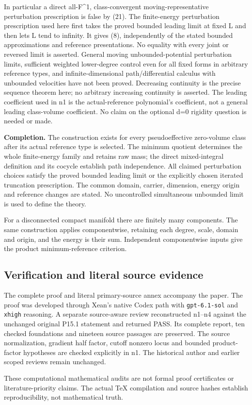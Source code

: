 \documentclass[
]{article}
\begin{document}
In particular a direct all-F\^{}1, class-convergent
moving-representative perturbation prescription is false by (21).
The finite-energy perturbation prescription used here first takes the
proved bounded leading limit at fixed L and then lets L tend to
infinity. It gives (8), independently of the stated bounded
approximations and reference presentations. No equality with every
joint or reversed limit is asserted. General moving unbounded-potential perturbation limits,
sufficient weighted lower-degree control even for all fixed forms in
arbitrary reference types, and infinite-dimensional path/differential
calculus with unbounded velocities have not been proved. Decreasing
continuity is the precise sequence theorem here; no arbitrary increasing
continuity is asserted. The leading coefficient used in n1 is the
actual-reference polynomial's coefficient, not a general leading
class-volume coefficient. No claim on the optional d=0 rigidity question
is needed or made.

\textbf{Completion.} The construction exists for every pseudoeffective
zero-volume class after its actual reference type is selected. The
minimum quotient determines the whole finite-energy family and retains
raw mass; the direct mixed-integral definition and its cocycle establish
path independence. All claimed perturbation choices satisfy the proved
bounded leading limit or the explicitly chosen iterated truncation
prescription. The common domain, carrier, dimension, energy origin and
reference changes are stated. No uncontrolled simultaneous unbounded
limit is used to define the theory.

For a disconnected compact manifold there are finitely many components.
The same construction applies componentwise, retaining each degree,
scale, domain and origin, and the energy is their sum. Independent
componentwise inputs give the product minimum-reference criterion.

\subsection{Verification and literal source evidence}

The complete proof and literal primary-source annex accompany the
paper. The proof was developed through Xean's native Codex path with
\texttt{gpt-6.1-sol} and \texttt{xhigh} reasoning. A separate source-aware
review reconstructed n1--n4 against the unchanged original P15.1
statement and returned PASS. Its complete report, ten checked
foundations and nineteen source passages are preserved. The source
normalization, gradient half factor, cutoff nonzero locus and bounded
product-factor hypotheses are checked explicitly in n1. The historical
author and earlier scoped reviews remain unchanged.

These computational mathematical audits are not formal proof
certificates or literature-priority claims. The actual TeX compilation
and source hashes establish reproducibility, not mathematical truth.
\end{document}
